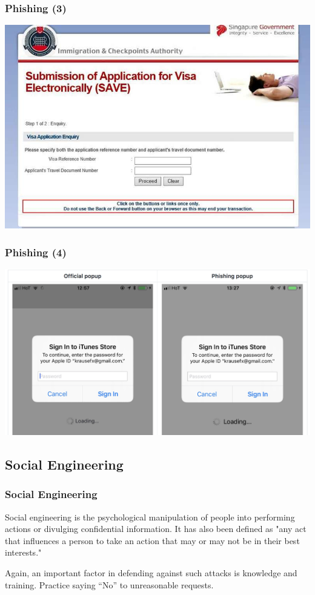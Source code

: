 \documentclass[aspectratio=169,dvipsnames]{beamer}
\begin{document}
\begin{frame}
\frametitle{Phishing (3)}
\begin{center}
\includegraphics[scale=0.375]{images/phishing_gov} 
\end{center}
\end{frame}

\begin{frame}
\frametitle{Phishing (4)}
\begin{center}
\includegraphics[scale=0.175]{images/phishing_apple.png} 
\end{center}
\end{frame}

\subsection{Social Engineering}

\begin{frame}
\frametitle{Social Engineering}
Social engineering is the psychological manipulation of people into performing actions or divulging confidential information. It has also been defined as "any act that influences a person to take an action that may or may not be in their best interests."
\pause\bigskip

Again, an important factor in defending against such attacks is knowledge and training. Practice saying ``No'' to unreasonable requests.
\end{frame}
\end{document}
